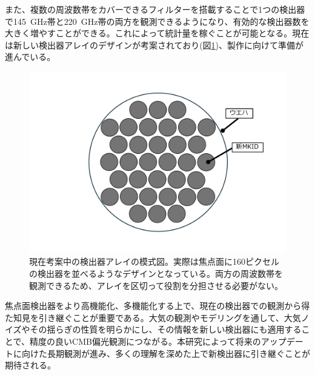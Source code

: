 また、複数の周波数帯をカバーできるフィルターを搭載することで1つの検出器で\SI{145}{GHz}帯と\SI{220}{GHz}帯の両方を観測できるようになり、有効的な検出器数を大きく増やすことができる。これによって統計量を稼ぐことが可能となる。現在は新しい検出器アレイのデザインが考案されており(図\ref{new_kid})、製作に向けて準備が進んでいる。
\begin{figure}[htbp]
  \centering
  \includegraphics[width=0.75\columnwidth]{6_prospect/figs/new_kid.pdf}
  \caption{現在考案中の検出器アレイの模式図。実際は焦点面に160ピクセルの検出器を並べるようなデザインとなっている。両方の周波数帯を観測できるため、アレイを区切って役割を分担させる必要がない。}
  \label{new_kid}
\end{figure}

焦点面検出器をより高機能化、多機能化する上で、現在の検出器での観測から得た知見を引き継ぐことが重要である。大気の観測やモデリングを通して、大気ノイズやその揺らぎの性質を明らかにし、その情報を新しい検出器にも適用することで、精度の良いCMB偏光観測につながる。本研究によって将来のアップデートに向けた長期観測が進み、多くの理解を深めた上で新検出器に引き継ぐことが期待される。



